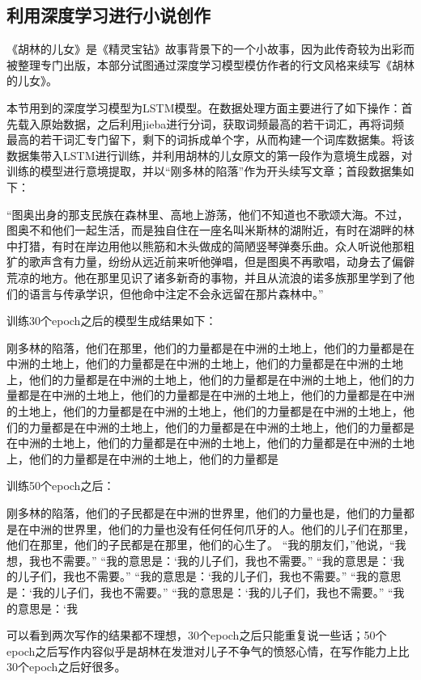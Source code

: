 \documentclass[10pt, a4paper]{article}
\begin{document}
\subsection{利用深度学习进行小说创作}

《胡林的儿女》是《精灵宝钻》故事背景下的一个小故事，因为此传奇较为出彩而被整理专门出版，本部分试图通过深度学习模型模仿作者的行文风格来续写《胡林的儿女》。

本节用到的深度学习模型为LSTM模型。在数据处理方面主要进行了如下操作：首先载入原始数据，之后利用jieba进行分词，获取词频最高的若干词汇，再将词频最高的若干词汇专门留下，剩下的词拆成单个字，从而构建一个词库数据集。将该数据集带入LSTM进行训练，并利用胡林的儿女原文的第一段作为意境生成器，对训练的模型进行意境提取，并以“刚多林的陷落”作为开头续写文章；首段数据集如下：

“图奥出身的那支民族在森林里、高地上游荡，他们不知道也不歌颂大海。不过，图奥不和他们一起生活，而是独自住在一座名叫米斯林的湖附近，有时在湖畔的林中打猎，有时在岸边用他以熊筋和木头做成的简陋竖琴弹奏乐曲。众人听说他那粗犷的歌声含有力量，纷纷从远近前来听他弹唱，但是图奥不再歌唱，动身去了偏僻荒凉的地方。他在那里见识了诸多新奇的事物，并且从流浪的诺多族那里学到了他们的语言与传承学识，但他命中注定不会永远留在那片森林中。”

训练30个epoch之后的模型生成结果如下：

刚多林的陷落，他们在那里，他们的力量都是在中洲的土地上，他们的力量都是在中洲的土地上，他们的力量都是在中洲的土地上，他们的力量都是在中洲的土地上，他们的力量都是在中洲的土地上，他们的力量都是在中洲的土地上，他们的力量都是在中洲的土地上，他们的力量都是在中洲的土地上，他们的力量都是在中洲的土地上，他们的力量都是在中洲的土地上，他们的力量都是在中洲的土地上，他们的力量都是在中洲的土地上，他们的力量都是在中洲的土地上，他们的力量都是在中洲的土地上，他们的力量都是在中洲的土地上，他们的力量都是在中洲的土地上，他们的力量都是在中洲的土地上，他们的力量都是

训练50个epoch之后：

刚多林的陷落，他们的子民都是在中洲的世界里，他们的力量也是，他们的力量都是在中洲的世界里，他们的力量也没有任何任何爪牙的人。他们的儿子们在那里，他们在那里，他们的子民都是在那里，他们的心生了。  “我的朋友们，”他说，“我想，我也不需要。”  “我的意思是：‘我的儿子们，我也不需要。”  “我的意思是：‘我的儿子们，我也不需要。”  “我的意思是：‘我的儿子们，我也不需要。”  “我的意思是：‘我的儿子们，我也不需要。”  “我的意思是：‘我的儿子们，我也不需要。”  “我的意思是：‘我

可以看到两次写作的结果都不理想，30个epoch之后只能重复说一些话；50个epoch之后写作内容似乎是胡林在发泄对儿子不争气的愤怒心情，在写作能力上比30个epoch之后好很多。


\newpage


\end{document}
